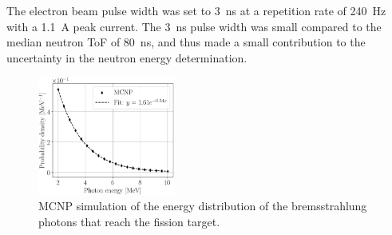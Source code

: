 \documentclass[%
 reprint,
 amsmath,amssymb,
 aps,
 nofootinbib
]{revtex4-1}
\begin{document}
The electron beam pulse width was set to 3~ns at a repetition rate of 240~Hz with a 1.1~A peak current.
The 3~ns pulse width was small compared to the median neutron ToF of 80~ns, and thus made a small contribution to the uncertainty in the neutron energy determination.
\begin{figure}[h]
\includegraphics[width=0.40\textwidth]{MCNPBremDistribution.png}
\caption{MCNP simulation of the energy distribution of the bremsstrahlung photons that reach the fission target.}
\label{fig:BremDist}
\end{figure}
\end{document}

